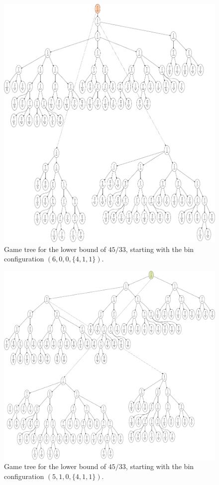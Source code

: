 \newpage
\begin{figure}[H]
\includegraphics[scale=0.6]{img/6-0-0.pdf}
\caption{Game tree for the lower bound of $45/33$, starting with the bin configuration $(6,0,0,\{4,1,1\})$.}
\end{figure}

\newpage
\begin{figure}[H]
\includegraphics[scale=0.6]{img/5-1-0.pdf}
\caption{Game tree for the lower bound of $45/33$, starting with the bin configuration $(5,1,0,\{4,1,1\})$.}
\end{figure}

